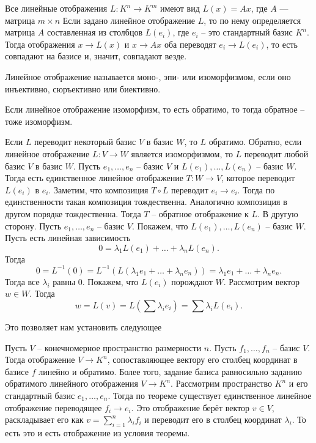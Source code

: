 \crl
Все линейные отображения $L\colon K^n \to K^m$ имеют вид $L(x)=Ax$, где $A$ --- матрица $m\times n$
\proof Если задано линейное отображение $L$, то по нему определяется матрица $A$ составленная из столбцов $L(e_i)$, где $e_i$ -- это стандартный базис $K^n$. Тогда отображения $x \to L(x)$ и $x \to Ax$ оба переводят $e_i \to L(e_i)$, то есть совпадают на базисе и, значит, совпадают везде.
\endproof
\ecrl

\dfn Линейное отображение называется моно-, эпи- или изоморфизмом, если оно инъективно, сюръективно или биективно.
\edfn

\rm Если линейное отображение изоморфизм, то есть обратимо, то тогда обратное -- тоже изоморфизм.
\erm

\crl Если $L$ переводит некоторый базис $V$ в базис $W$, то $L$ обратимо. Обратно, если линейное отображение $L \colon V \to W$ является изоморфизмом, то $L$ переводит любой базис $V$ в базис $W$.
\proof
Пусть $e_1,\dots,e_n$ -- базис $V$ и $L(e_1),\dots,L(e_n)$ -- базис $W$. Тогда есть единственное линейное отображение $T \colon W \to V$, которое переводит $L(e_i)$ в $e_i$. Заметим, что композиция $T\circ L$ переводит $e_i \to e_i$. Тогда по единственности такая композиция тождественна. Аналогично композиция в другом порядке тождественна. Тогда $T$ -- обратное отображение к $L$.
 В другую сторону. Пусть $e_1,\dots,e_n$ -- базис $V$. Покажем, что $L(e_1),\dots,L(e_n)$ -- базис $W$.  Пусть есть линейная зависимость  $$0=\lambda_1 L(e_1)+\dots+\lambda_n L(e_n).$$
Тогда
$$0=L^{-1}(0)=L^{-1}(L(\lambda_1 e_1+\dots+\lambda_n e_n))=\lambda_1 e_1+\dots+\lambda_n e_n.$$
Тогда все $\lambda_i$ равны 0. Покажем, что $L(e_i)$ порождают $W$. Рассмотрим вектор $w\in W$. Тогда $$w=L(v)=L\left(\sum \lambda_i e_i\right)=\sum \lambda_i L(e_i).$$
\endproof
\ecrl

Это позволяет нам установить следующее

\crl Пусть $V$ -- конечномерное пространство размерности $n$. Пусть $f_1,\dots,f_n$ -- базис $V$. Тогда  отображение $V\to K^n$, сопоставляющее вектору его столбец координат в базисе $f$ линейно и обратимо. Более того, задание базиса равносильно заданию обратимого линейного отображения $V\to K^n$.
\proof
Рассмотрим пространство $K^n$ и его стандартный базис $e_1,\dots,e_n$. Тогда по теореме существует единственное  линейное отображение переводящее $f_i \to e_i$. Это отображение берёт вектор $v \in V$, раскладывает его как $v=\sum_{i=1}^n \lambda_i f_i$ и переводит его в столбец координат $\lambda_i$. То есть это и есть отображение из условия теоремы.


